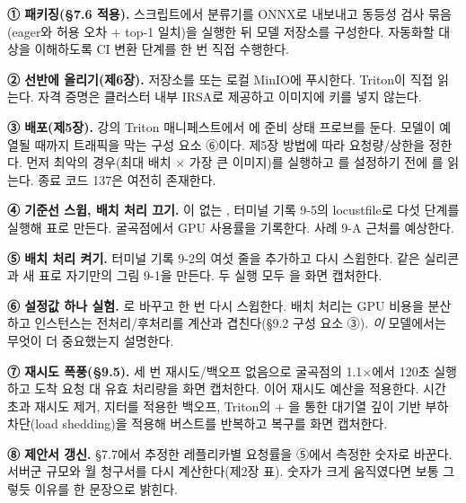 \begin{tbbitemize}
  \item \textbf{① 패키징(§7.6 적용).} 스크립트에서 분류기를 ONNX로 내보내고 동등성 검사 묶음(eager와 허용 오차 + top-1 일치)을 실행한 뒤 모델 저장소를 구성한다. 자동화할 대상을 이해하도록 CI 변환 단계를 한 번 직접 수행한다.
  \item \textbf{② 선반에 올리기(제6장).} 저장소를  또는 로컬 MinIO에 푸시한다. Triton이 직접 읽는다. 자격 증명은 클러스터 내부 IRSA로 제공하고 이미지에 키를 넣지 않는다.
  \item \textbf{③ 배포(제5장).} 강의 Triton 매니페스트에서 에 준비 상태 프로브를 둔다. 모델이 예열될 때까지 트래픽을 막는 구성 요소 ⑥이다. 제5장 방법에 따라 요청량/상한을 정한다. 먼저 최악의 경우(최대 배치 × 가장 큰 이미지)를 실행하고 를 설정하기 전에 를 읽는다. 종료 코드 137은 여전히 존재한다.
  \item \textbf{④ 기준선 스윕, 배치 처리 끄기.} 이 없는 , 터미널 기록 9-5의 locustfile로 다섯 단계를 실행해 표로 만든다. 굴곡점에서 GPU 사용률을 기록한다. 사례 9-A 근처를 예상한다.
  \item \textbf{⑤ 배치 처리 켜기.} 터미널 기록 9-2의 여섯 줄을 추가하고 다시 스윕한다. 같은 실리콘과 새 표로 자기만의 그림 9-1을 만든다. 두 실행 모두 을 화면 캡처한다.
  \item \textbf{⑥ 설정값 하나 실험.} 로 바꾸고 한 번 다시 스윕한다. 배치 처리는 GPU 비용을 분산하고 인스턴스는 전처리/후처리를 계산과 겹친다(§9.2 구성 요소 ③). \textit{이} 모델에서는 무엇이 더 중요했는지 설명한다.
  \item \textbf{⑦ 재시도 폭풍(§9.5).} 세 번 재시도/백오프 없음으로 굴곡점의 1.1×에서 120초 실행하고 도착 요청 대 유효 처리량을 화면 캡처한다. 이어 재시도 예산을 적용한다. 시간 초과 재시도 제거, 지터를 적용한 백오프, Triton의  + 을 통한 대기열 깊이 기반 부하 차단(load shedding)을 적용해 버스트를 반복하고 복구를 화면 캡처한다.
  \item \textbf{⑧ 제안서 갱신.} §7.7에서 추정한 레플리카별 요청률을 ⑤에서 측정한 숫자로 바꾼다. 서버군 규모와 월 청구서를 다시 계산한다(제2장 표). 숫자가 크게 움직였다면 보통 그렇듯 이유를 한 문장으로 밝힌다.
\end{tbbitemize}

